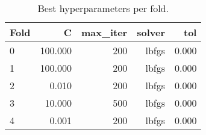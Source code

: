 \begin{table}
\caption{Best hyperparameters per fold.}
\label{tab:hyperparams}
\begin{tabular}{lrrrr}
\toprule
Fold & C & max\_iter & solver & tol \\
\midrule
0 & 100.000 & 200 & lbfgs & 0.000 \\
1 & 100.000 & 200 & lbfgs & 0.000 \\
2 & 0.010 & 200 & lbfgs & 0.000 \\
3 & 10.000 & 500 & lbfgs & 0.000 \\
4 & 0.001 & 200 & lbfgs & 0.000 \\
\bottomrule
\end{tabular}
\end{table}
